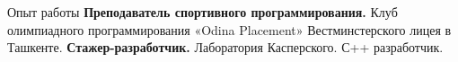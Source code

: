 \begin{rubric}{Опыт работы}
\entry*[2017 -- 2019]%
	\textbf{Преподаватель спортивного программирования.} Клуб олимпиадного программирования «Odina Placement» Вестминстерского лицея в Ташкенте. 
%
%
%
	\textbf{Стажер-разработчик.} Лаборатория Касперского. С++ разработчик.
%
\end{rubric}